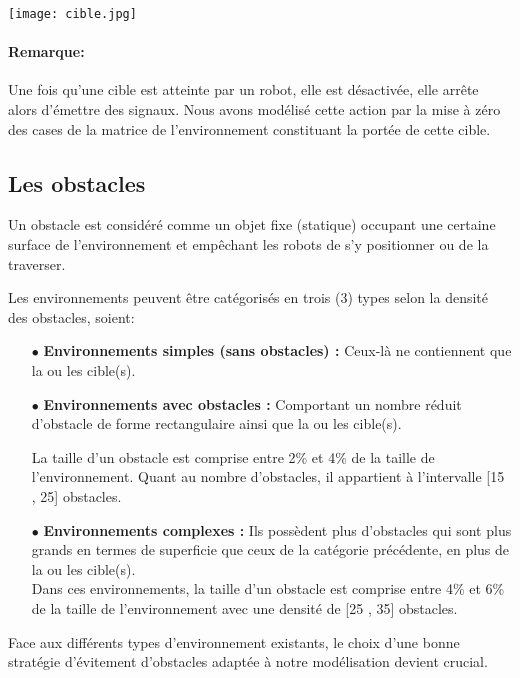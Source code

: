 \begin{center}	  
	\texttt{[image: cible.jpg]}%
	\vspace{-0.1 cm}
	\label{cible}%
\end{center}

\paragraph{Remarque:}
Une fois qu'une cible est atteinte par un robot, elle est désactivée, elle arrête alors d'émettre des signaux. Nous avons modélisé cette action par la mise à zéro des cases de la matrice de l'environnement constituant la portée de cette cible.


\subsection{Les obstacles}
Un obstacle est considéré comme un objet fixe (statique) occupant une certaine surface de l'environnement et empêchant les robots de s'y positionner ou de la traverser.

Les environnements peuvent être catégorisés en trois (3) types selon la densité des obstacles, soient:

\begin{itemize}
	\item[$\bullet$] \textbf{Environnements simples (sans obstacles) :} Ceux-là ne contiennent que la ou les cible(s).
	\item[$\bullet$] \textbf{Environnements avec obstacles :} Comportant un nombre réduit d'obstacle de forme rectangulaire ainsi que la ou les cible(s).
	
	La taille d'un obstacle est comprise entre 2\% et 4\% de la taille de l'environnement. Quant au nombre d'obstacles, il appartient à l'intervalle [15 , 25] obstacles.
	
	\item[$\bullet$] \textbf{Environnements complexes :} Ils possèdent plus d'obstacles qui sont plus grands en termes de superficie que ceux de la catégorie précédente, en plus de la ou les cible(s).\\
	Dans ces environnements, la taille d'un obstacle est comprise entre 4\% et 6\% de la taille de l'environnement avec une densité de [25 , 35] obstacles.
\end{itemize}
\textbf{ }

Face aux différents types d'environnement existants, le choix d'une bonne stratégie d'évitement d'obstacles adaptée à notre modélisation devient crucial.


